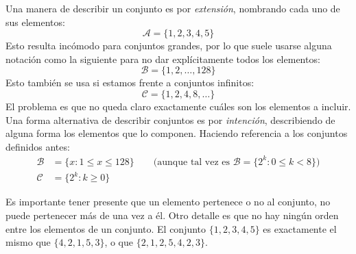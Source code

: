   Una manera de describir un conjunto es por \emph{extensión},%
  nombrando cada uno de sus elementos:
  \begin{equation*}
    \mathcal{A}
      = \{1, 2, 3, 4, 5\}
  \end{equation*}
  Esto resulta incómodo para conjuntos grandes,
  por lo que suele usarse alguna notación como la siguiente
  para no dar explícitamente todos los elementos:
  \begin{equation*}
    \mathcal{B}
      = \{1, 2, \dotsc, 128\}
  \end{equation*}
  Esto también se usa si estamos frente a conjuntos infinitos:
  \begin{equation*}
    \mathcal{C}
      = \{1, 2, 4, 8, \dotsc\}
  \end{equation*}
  El problema es que no queda claro exactamente cuáles
  son los elementos a incluir.
  Una forma alternativa
  de describir conjuntos es por \emph{intención},%
  describiendo de alguna forma los elementos que lo componen.
  Haciendo referencia a los conjuntos definidos antes:
  \begin{align*}
    \mathcal{B}
      &= \{x \colon 1 \le x \le 128\}
	 \qquad \text{(aunque tal vez es
			\(\mathcal{B}
			    =\{2^k \colon 0 \le k < 8\}\))} \\
    \mathcal{C}
      &= \{2^k \colon k \ge 0\}
  \end{align*}

  Es importante tener presente
  que un elemento pertenece o no al conjunto,
  no puede pertenecer más de una vez a él.
  Otro detalle es que no hay ningún orden
  entre los elementos de un conjunto.
  El conjunto \(\{1, 2, 3, 4, 5\}\) es exactamente el mismo que
  \(\{4, 2, 1, 5, 3\}\),
  o que \(\{2, 1, 2, 5, 4, 2, 3\}\).

